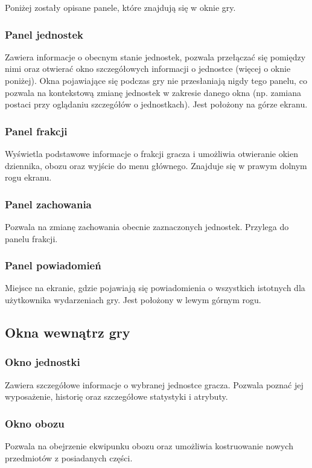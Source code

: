 \documentclass[licencjacka]{pracamgr}
\begin{document}
      Poniżej zostały opisane panele, które znajdują się w oknie gry.

      \subsubsection{Panel jednostek}
      Zawiera informacje o obecnym stanie jednostek, pozwala przełączać się pomiędzy nimi oraz otwierać okno szczegółowych informacji o jednostce
      (więcej o oknie poniżej). Okna pojawiające się podczas gry nie przesłaniają nigdy tego panelu, co pozwala na kontekstową zmianę jednostek
      w zakresie danego okna (np. zamiana postaci przy oglądaniu szczegółów o jednostkach). Jest położony na górze ekranu.

      \subsubsection{Panel frakcji}
      Wyświetla podstawowe informacje o frakcji gracza i umożliwia otwieranie okien dziennika, obozu oraz wyjście do menu głównego.
      Znajduje się w prawym dolnym rogu ekranu.
      \subsubsection{Panel zachowania}
      Pozwala na zmianę zachowania obecnie zaznaczonych jednostek. Przylega do panelu frakcji.
      \subsubsection{Panel powiadomień}
      Miejsce na ekranie, gdzie pojawiają się powiadomienia o wszystkich istotnych dla użytkownika wydarzeniach gry. Jest położony w lewym górnym rogu.

    \subsection{Okna wewnątrz gry}
      \subsubsection{Okno jednostki}
      Zawiera szczegółowe informacje o wybranej jednostce gracza. Pozwala poznać jej wyposażenie, historię oraz szczegółowe statystyki i atrybuty.
      \subsubsection{Okno obozu}
      Pozwala na obejrzenie ekwipunku obozu oraz umożliwia kostruowanie nowych przedmiotów z posiadanych części.
\end{document}

